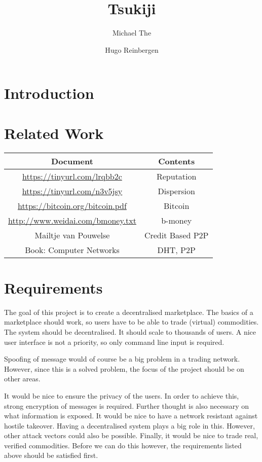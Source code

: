 \documentclass[]{article}
\title{Tsukiji}
\author{Michael The \and Hugo Reinbergen}
\begin{document}
\maketitle

\begin{abstract}

\end{abstract}

\section{Introduction}
\section{Related Work}
\begin{tabular}{|c|c|}
 \hline
 Document & Contents  \\
 \hline
 \url{https://tinyurl.com/lrqbb2c} & Reputation \\
 \url{https://tinyurl.com/n3v5jsy} & Dispersion \\
 \url{https://bitcoin.org/bitcoin.pdf} & Bitcoin \\
 \url{http://www.weidai.com/bmoney.txt} & b-money \\
 Mailtje van Pouwelse & Credit Based P2P \\
 Book: Computer Networks & DHT, P2P \\
 \hline
\end{tabular}

\section{Requirements}

The goal of this project is to create a decentralised marketplace.
The basics of a marketplace should work, so users have to be able to trade (virtual) commodities.
The system should be decentralised.
It should scale to thousands of users.
A nice user interface is not a priority, so only command line input is required.

Spoofing of message would of course be a big problem in a trading network.
However, since this is a solved problem, the focus of the project should be on other areas.

It would be nice to ensure the privacy of the users.
In order to achieve this, strong encryption of messages is required.
Further thought is also necessary on what information is exposed.
It would be nice to have a network resistant against hostile takeover.
Having a decentralised system plays a big role in this.
However, other attack vectors could also be possible.
Finally, it would be nice to trade real, verified commodities.
Before we can do this however, the requirements listed above should be satisfied first.
\end{document}
